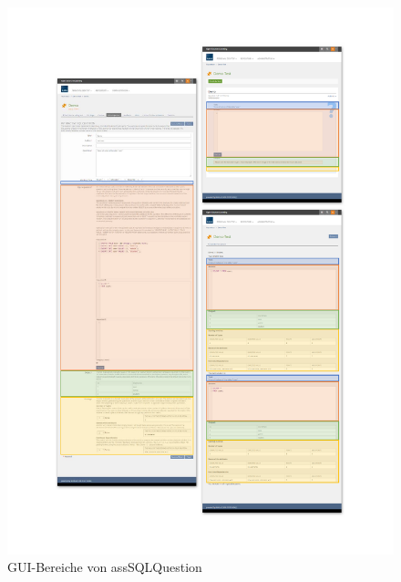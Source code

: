     \begin{figure}[H]
        \begin{center}
            \includegraphics[page=1, width=0.7\paperwidth, trim=4 4 4 4, clip]{fig/GUIAreas.pdf} 
            \caption{GUI-Bereiche von assSQLQuestion}
            \label{fig:gui-bereiche}
        \end{center}
    \end{figure}
    
 





